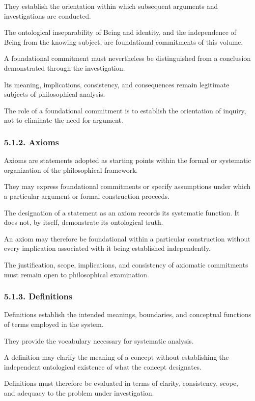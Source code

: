 They establish the orientation within
which subsequent arguments and
investigations are conducted.

The ontological inseparability of Being
and identity, and the independence
of Being from the knowing subject,
are foundational commitments of
this volume.

A foundational commitment must
nevertheless be distinguished from
a conclusion demonstrated through
the investigation.

Its meaning, implications, consistency,
and consequences remain legitimate
subjects of philosophical analysis.

The role of a foundational commitment
is to establish the orientation of inquiry,
not to eliminate the need for argument.

\subsubsection*{5.1.2. Axioms}

Axioms are statements adopted as
starting points within the formal
or systematic organization of the
philosophical framework.

They may express foundational
commitments or specify assumptions
under which a particular argument
or formal construction proceeds.

The designation of a statement
as an axiom records its systematic
function. It does not, by itself,
demonstrate its ontological truth.

An axiom may therefore be foundational
within a particular construction without
every implication associated with it
being established independently.

The justification, scope, implications,
and consistency of axiomatic commitments
must remain open to philosophical
examination.

\subsubsection*{5.1.3. Definitions}

Definitions establish the intended
meanings, boundaries, and conceptual
functions of terms employed in the
system.

They provide the vocabulary necessary
for systematic analysis.

A definition may clarify the meaning
of a concept without establishing
the independent ontological existence
of what the concept designates.

Definitions must therefore be evaluated
in terms of clarity, consistency,
scope, and adequacy to the problem
under investigation.

